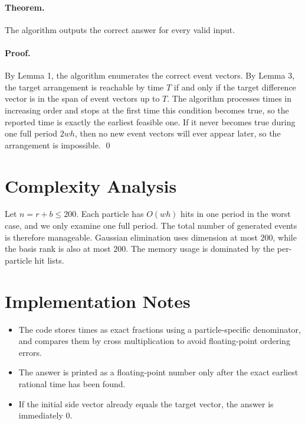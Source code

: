 \documentclass[11pt]{article}
\begin{document}
\paragraph{Theorem.}
The algorithm outputs the correct answer for every valid input.

\paragraph{Proof.}
By Lemma 1, the algorithm enumerates the correct event vectors. By Lemma 3, the target arrangement is reachable by time $T$ if and only if the target difference vector is in the span of event vectors up to $T$. The algorithm processes times in increasing order and stops at the first time this condition becomes true, so the reported time is exactly the earliest feasible one. If it never becomes true during one full period $2wh$, then no new event vectors will ever appear later, so the arrangement is impossible. \qed

\section*{Complexity Analysis}

Let $n=r+b \le 200$. Each particle has $O(wh)$ hits in one period in the worst case, and we only examine one full period. The total number of generated events is therefore manageable. Gaussian elimination uses dimension at most $200$, while the basis rank is also at most $200$. The memory usage is dominated by the per-particle hit lists.

\section*{Implementation Notes}

\begin{itemize}[leftmargin=*]
    \item The code stores times as exact fractions using a particle-specific denominator, and compares them by cross multiplication to avoid floating-point ordering errors.
    \item The answer is printed as a floating-point number only after the exact earliest rational time has been found.
    \item If the initial side vector already equals the target vector, the answer is immediately $0$.
\end{itemize}
\end{document}

